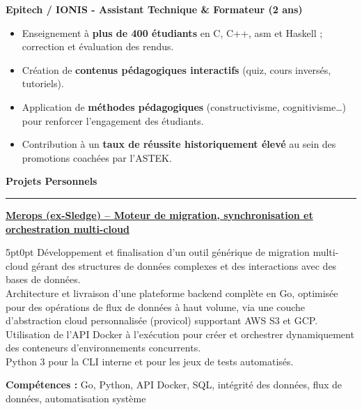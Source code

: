 \documentclass[9pt]{extarticle}
\begin{document}
\par\vspace{5pt}

{\bfseries Epitech / IONIS - Assistant Technique \& Formateur (2 ans)}
\begin{itemize}[noitemsep, topsep=0pt]
	\item Enseignement à {\bfseries plus de 400 étudiants} en C, C++, asm et Haskell ; correction et évaluation des rendus.
	\item Création de {\bfseries contenus pédagogiques interactifs} (quiz, cours inversés, tutoriels).
	\item Application de {\bfseries méthodes pédagogiques} (constructivisme, cognitivisme…) pour renforcer l'engagement des étudiants.
	\item Contribution à un {\bfseries taux de réussite historiquement élevé} au sein des promotions coachées par l'ASTEK.
\end{itemize}

\par\vspace{5pt}


{\large\bfseries Projets Personnels}
\par\vspace{-8pt}
\rule{\linewidth}{0.4pt}
\par\vspace{5pt}

\underline{\bfseries Merops (ex-Sledge) -- Moteur de migration, synchronisation et orchestration multi-cloud}
\par
\begin{adjustwidth}{5pt}{0pt}
    Développement et finalisation d'un outil générique de migration multi-cloud gérant des structures de données complexes et des interactions avec des bases de données. \\
    Architecture et livraison d'une plateforme backend complète en Go, optimisée pour des opérations de flux de données à haut volume, via une couche d'abstraction cloud personnalisée ({\ttfamily provicol}) supportant AWS S3 et GCP. \\
    Utilisation de l'API Docker à l'exécution pour créer et orchestrer dynamiquement des conteneurs d'environnements concurrents. \\
    Python 3 pour la CLI interne et pour les jeux de tests automatisés.
\end{adjustwidth}
\par
{\bfseries Compétences :} Go, Python, API Docker, SQL, intégrité des données, flux de données, automatisation système
\end{document}
